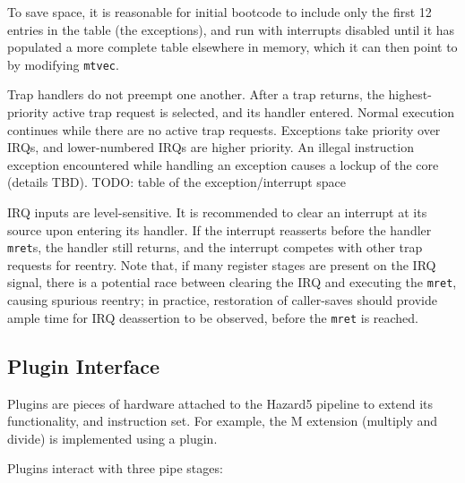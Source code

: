 To save space, it is reasonable for initial bootcode to include only the first 12 entries in the table (the exceptions), and run with interrupts disabled until it has populated a more complete table elsewhere in memory, which it can then point to by modifying {\tt mtvec}.

Trap handlers do not preempt one another. After a trap returns, the highest-priority active trap request is selected, and its handler entered. Normal execution continues while there are no active trap requests. Exceptions take priority over IRQs, and lower-numbered IRQs are higher priority. An illegal instruction exception encountered while handling an exception causes a lockup of the core (details TBD). TODO: table of the exception/interrupt space

IRQ inputs are level-sensitive. It is recommended to clear an interrupt at its source upon entering its handler. If the interrupt reasserts before the handler {\tt mret}s, the handler still returns, and the interrupt competes with other trap requests for reentry. Note that, if many register stages are present on the IRQ signal, there is a potential race between clearing the IRQ and executing the {\tt mret}, causing spurious reentry; in practice, restoration of caller-saves should provide ample time for IRQ deassertion to be observed, before the {\tt mret} is reached.


\subsection{Plugin Interface}

Plugins are pieces of hardware attached to the Hazard5 pipeline to extend its functionality, and instruction set. For example, the M extension (multiply and divide) is implemented using a plugin.

Plugins interact with three pipe stages:

